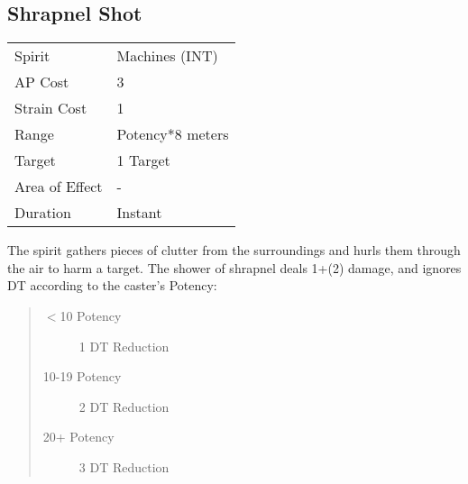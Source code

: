 \documentclass[11pt,a4paper,twocolumn]{book}
\begin{document}
\subsection*{Shrapnel Shot}
{
	\begin{tabu} to 70mm{| X[l,4] | X[l,7] |}
		\hline
		Spirit         & Machines (INT)        \\
		AP Cost        & 3                     \\
		Strain Cost    & 1                     \\
		Range          & Potency*8 meters \\
		Target         & 1 Target              \\
		Area of Effect & -                     \\
		Duration       & Instant               \\ \hline
	\end{tabu}
	
}

\medskip

The spirit gathers pieces of clutter from the surroundings and hurls them through the air to harm a target. The shower of shrapnel deals 1+(2) damage, and ignores DT according to the caster's Potency: 
\begin{quote}
	\begin{description}
		\item[$<$10 Potency] 	1 DT Reduction
		\item[10-19 Potency] 	2 DT Reduction
		\item[20+ Potency] 		3 DT Reduction
	\end{description}	
\end{quote}


%	
%
%
%
\end{document}
